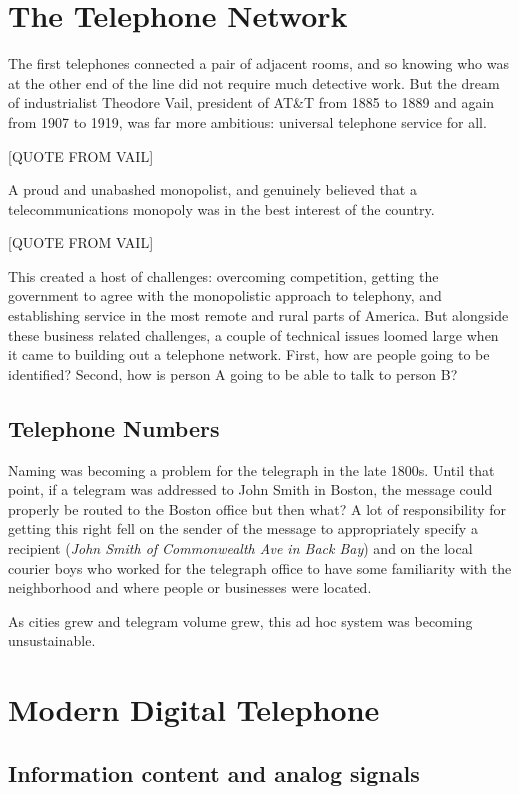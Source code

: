 \documentclass[UTF8]{book}
\begin{document}
\begin{CJK}{UTF8}{gbsn}
\chapter{The Telephone Network}

The first telephones connected a pair of adjacent rooms, and so knowing who was at the other end of the line did not require much detective work. But the dream of industrialist Theodore Vail, president of AT\&T from 1885 to 1889 and again from 1907 to 1919, was far more ambitious: universal telephone service for all.

[QUOTE FROM VAIL]

A proud and unabashed monopolist, and genuinely believed that a telecommunications monopoly was in the best interest of the country.

[QUOTE FROM VAIL]

This created a host of challenges: overcoming competition, getting the government to agree with the monopolistic approach to telephony, and establishing service in the most remote and rural parts of America. But alongside these business related challenges, a couple of technical issues loomed large when it came to building out a telephone network. First, how are people going to be identified? Second, how is person A going to be able to talk to person B?

\section{Telephone Numbers}

Naming was becoming a problem for the telegraph in the late 1800s. Until that point, if a telegram was addressed to John Smith in Boston, the message could properly be routed to the Boston office but then what? A lot of responsibility for getting this right fell on the sender of the message to appropriately specify a recipient (\emph{John Smith of Commonwealth Ave in Back Bay}) and on the local courier boys who worked for the telegraph office to have some familiarity with the neighborhood and where people or businesses were located.

As cities grew and telegram volume grew, this ad hoc system was becoming unsustainable.


\chapter{Modern Digital Telephone}

\section{Information content and analog signals}


\end{CJK}
\end{document}
